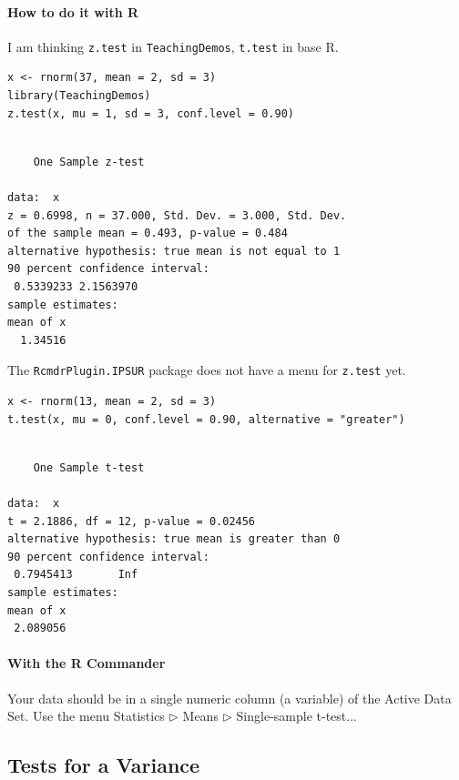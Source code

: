 \documentclass[captions=tableheading]{scrbook}
\begin{document}
\paragraph*{How to do it with \textsf{R}}

I am thinking \texttt{z.test} in \texttt{TeachingDemos}, \texttt{t.test} in base \textsf{\small R}.


\begin{verbatim}
x <- rnorm(37, mean = 2, sd = 3)
library(TeachingDemos)
z.test(x, mu = 1, sd = 3, conf.level = 0.90)
\end{verbatim}


\begin{verbatim}
 
	One Sample z-test

data:  x 
z = 0.6998, n = 37.000, Std. Dev. = 3.000, Std. Dev.
of the sample mean = 0.493, p-value = 0.484
alternative hypothesis: true mean is not equal to 1 
90 percent confidence interval:
 0.5339233 2.1563970 
sample estimates:
mean of x 
  1.34516
\end{verbatim}

The \texttt{RcmdrPlugin.IPSUR} package does not have a menu for \texttt{z.test} yet. 


\begin{verbatim}
x <- rnorm(13, mean = 2, sd = 3)
t.test(x, mu = 0, conf.level = 0.90, alternative = "greater")
\end{verbatim}


\begin{verbatim}

	One Sample t-test

data:  x 
t = 2.1886, df = 12, p-value = 0.02456
alternative hypothesis: true mean is greater than 0 
90 percent confidence interval:
 0.7945413       Inf 
sample estimates:
mean of x 
 2.089056
\end{verbatim}

\paragraph*{With the \textsf{R} Commander}

Your data should be in a single numeric column (a variable) of the Active Data Set. Use the menu \textsf{Statistics \(\triangleright\) Means \(\triangleright\) Single-sample t-test...} 
\subsection{Tests for a Variance}
\label{sec-10-2-2}
\end{document}
